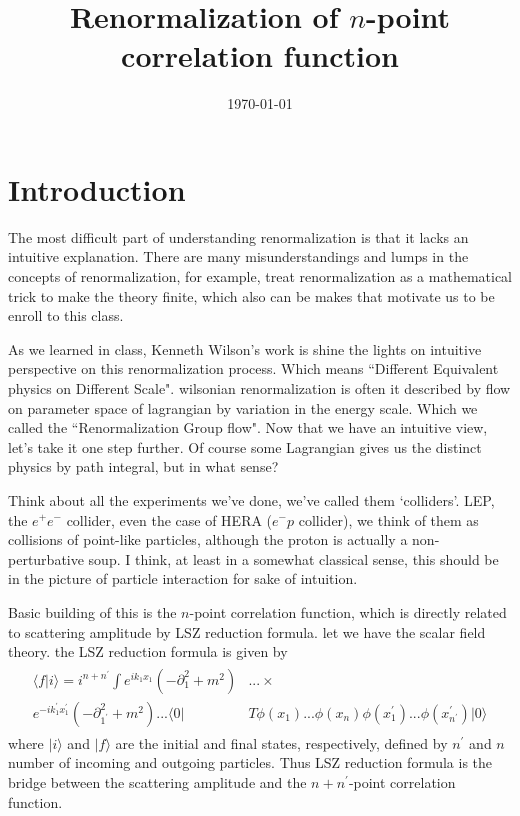 \documentclass[12pt,halfline,a4paper]{ouparticle}
\begin{document}
\setlength{\parskip}{0.5em}
\title{Renormalization of $n$-point correlation function}
\newtheorem{theorem}{Theorem}
\newtheorem{definition}{Definition}
\newtheorem{lemma}{Lemma}
\author{%
}


\date{\today}

\maketitle


\section{Introduction}
\label{sec1}
The most difficult part of understanding renormalization is that it lacks an intuitive explanation. 
There are many misunderstandings and lumps in the concepts of renormalization,
for example, treat renormalization as a mathematical trick to make the theory finite, which also can be makes that motivate us to be enroll to this class.

As we learned in class, Kenneth Wilson's work is shine the lights on intuitive perspective on this renormalization process.
Which means ``Different Equivalent physics on Different Scale".
wilsonian renormalization is often it described by flow on parameter space of lagrangian by variation in the energy scale. 
Which we called the ``Renormalization Group flow".
Now that we have an intuitive view, let's take it one step further.	
Of course some Lagrangian gives us the distinct physics by path integral, but in what sense?

Think about all the experiments we've done, we've called them `colliders'. LEP, the $e^+e^-$ collider, even the case of HERA ($e^- p$ collider), we think of them as collisions of point-like particles, although the proton is actually a non-perturbative soup.
I think, at least in a somewhat classical sense, this should be in the picture of particle interaction for sake of intuition.


Basic building of this is the $n$-point correlation function, which is directly related to scattering amplitude by LSZ reduction formula. let we have the scalar field theory.
the LSZ reduction formula is given by
\begin{align}\begin{split}
\label{LSZ}
\langle f| i\rangle = i^{n+n^\prime}\int e^{ik_1x_1}(-\partial^2_1+m^2)&...\times\\e^{-ik^\prime_1x^\prime_1}(-\partial^2_{1^\prime}+m^2)...\langle 0|&T\phi(x_1)...\phi(x_n)\phi(x^\prime_1)...\phi(x^\prime_{n^\prime})|0\rangle
\end{split}\end{align}
where $|i\rangle$ and $|f\rangle$ are the initial and final states, respectively, defined by $n^\prime$ and $n$ number of incoming and outgoing particles. Thus LSZ reduction formula is the bridge between the scattering amplitude and the $n+n^\prime$-point correlation function.
\end{document}
